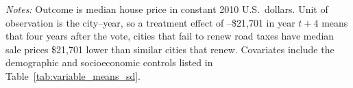 \begin{table}[H]
\begin{threeparttable}
\begin{tabular}{p{4.5cm}ccccccc}
    \bottomrule
  \end{tabular}
  \begin{tablenotes}[flushleft]
    \small
    \item \textit{Notes:} Outcome is median house price in constant 2010 U.S.\ dollars. Unit of observation is the city–year, so a treatment effect of –\$21,701 in year $t+4$ means that four years after the vote, cities that fail to renew road taxes have median sale prices \$21,701 lower than similar cities that renew. Covariates include the demographic and socioeconomic controls listed in Table~\ref{tab:variable_means_sd}.
  \end{tablenotes}
  \end{threeparttable}
\end{table}





